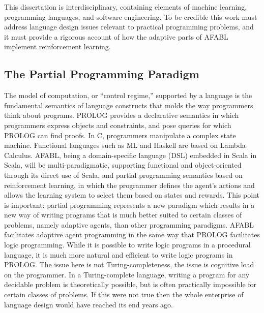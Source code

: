 This dissertation is interdisciplinary, containing elements of machine learning, programming languages, and software engineering.  To be credible this work must address language design issues relevant to practical programming problems, and it must provide a rigorous account of how the adaptive parts of AFABL implement reinforcement learning.

\subsection{The Partial Programming Paradigm}

The model of computation, or ``control regime,'' supported by a language is the fundamental semantics of language constructs that molds the way programmers think about programs. PROLOG provides a declarative semantics in which programmers express objects and constraints, and pose queries for which PROLOG can find proofs.  In C, programmers manipulate a complex state machine. Functional languages such as ML and Haskell are based on Lambda Calculus. AFABL, being a domain-specific language (DSL) \cite{hudak1996building} embedded in Scala \cite{odersky2008programming,odersky2005scalable} in Scala, will be multi-paradigmatic, supporting functional and object-oriented through its direct use of Scala, and partial programming semantics based on reinforcement learning, in which the programmer defines the agent's actions and allows the learning system to select them based on states and rewards.  This point is important: partial programming represents a new paradigm which results in a new way of writing programs that is much better suited to certain classes of problems, namely adaptive agents, than other programming paradigms.  AFABL facilitates adaptive agent programming in the same way that PROLOG facilitates logic programming.  While it is possible to write logic programs in a procedural language, it is much more natural and efficient to write logic programs in PROLOG.  The issue here is not Turing-completeness, the issue is cognitive load on the programmer.  In a Turing-complete language, writing a program for any decidable problem is theoretically possible, but is often practically impossible for certain classes of problems.  If this were not true then the whole enterprise of language design would have reached its end years ago.

